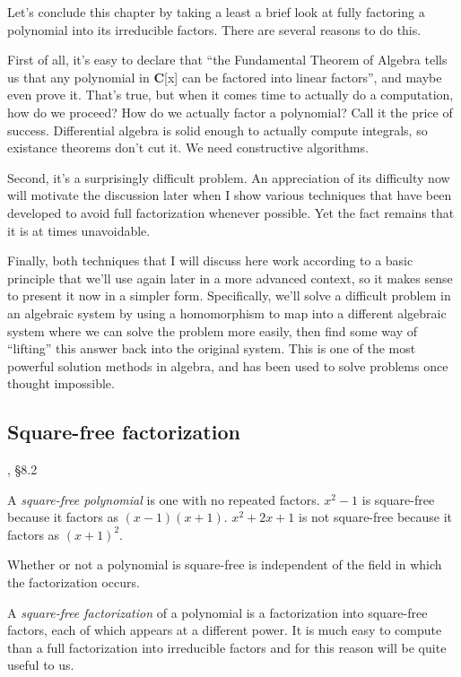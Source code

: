 \vfill\eject


Let's conclude this chapter by taking a least a brief look at fully
factoring a polynomial into its irreducible factors.  There are
several reasons to do this.

First of all, it's easy to declare that ``the Fundamental Theorem of
Algebra tells us that any polynomial in {\bf C}[x] can be factored
into linear factors'', and maybe even prove it.  That's true, but when it comes
time to actually do a computation, how do we proceed?  How do we
actually factor a polynomial?  Call it the price of success.
Differential algebra is solid enough to actually compute integrals, so
existance theorems don't cut it.  We need constructive algorithms.

Second, it's a surprisingly difficult problem.  An appreciation of its
difficulty now will motivate the discussion later when I show various
techniques that have been developed to avoid full factorization
whenever possible.  Yet the fact remains that it is at times
unavoidable.

Finally, both techniques that I will discuss here work according to a
basic principle that we'll use again later in a more advanced context,
so it makes sense to present it now in a simpler form.  Specifically,
we'll solve a difficult problem in an algebraic system by using a
homomorphism to map into a different algebraic system where we can
solve the problem more easily, then find some way of ``lifting'' this
answer back into the original system.  This is one of the most
powerful solution methods in algebra, and has been used to solve
problems once thought impossible.

\subsection*{\qquad Square-free factorization}

\hbox{}\qquad [Geddes], \S 8.2

A {\it square-free polynomial} is one with no repeated factors.
$x^2-1$ is square-free because it factors as $(x-1)(x+1)$.  $x^2+2x+1$
is not square-free because it factors as $(x+1)^2$.

Whether or not a polynomial is square-free is independent of the field
in which the factorization occurs.

A {\it square-free factorization} of a polynomial is a factorization
into square-free factors, each of which appears at a different power.
It is much easy to compute than a full factorization into irreducible
factors and for this reason will be quite useful to us.

